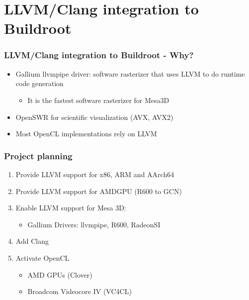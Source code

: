 \documentclass{smilebeamer}
\begin{document}
\section{LLVM/Clang integration to Buildroot}

\begin{frame}
\frametitle{LLVM/Clang integration to Buildroot - Why?}
\begin{itemize}
  \item Gallium llvmpipe driver: software rasterizer that uses LLVM to do runtime code generation
  \begin{itemize}
    \item It is the fastest software rasterizer for Mesa3D
  \end{itemize}
  \item OpenSWR for scientific visualization (AVX, AVX2)
  \item Most OpenCL implementations rely on LLVM
\end{itemize}
\end{frame}



\begin{frame}
\frametitle{Project planning}
\begin{enumerate}
  \item Provide LLVM support for x86, ARM and AArch64
  \item Provide LLVM support for AMDGPU (R600 to GCN)
  \item Enable LLVM support for Mesa 3D:
    \begin{itemize}
      \item Gallium Drivers: llvmpipe, R600, RadeonSI
    \end{itemize}
  \item Add Clang
  \item Activate OpenCL
  \begin{itemize}
    \item AMD GPUs (Clover)
    \item Broadcom Videocore IV (VC4CL)
  \end{itemize}
\end{enumerate}
\end{frame}
\end{document}
